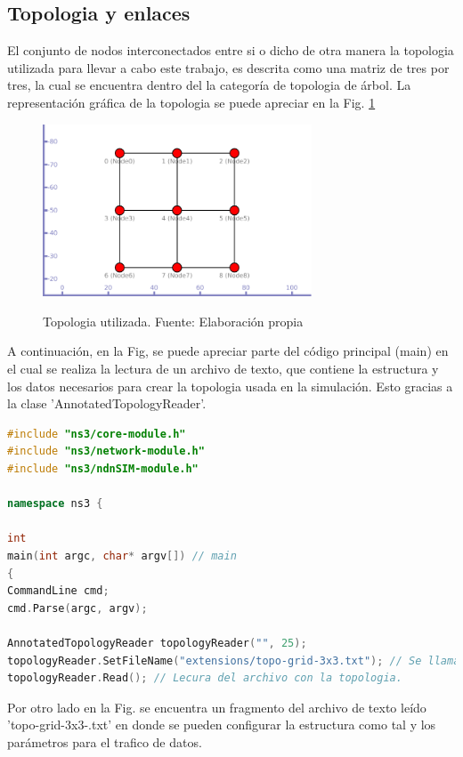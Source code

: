 \documentclass[12pt]{ociamthesis}  %
\begin{document}
\subsection{Topologia y enlaces}

El conjunto de nodos interconectados entre si o dicho de otra manera la topologia utilizada para llevar a cabo este trabajo, es descrita como una matriz de tres por tres, la cual se encuentra dentro del la categoría de topologia de árbol. La representación gráfica de la topologia se puede apreciar en la Fig. \ref{topologia_3x3_plugin}

\begin{figure}[!htb]
	\centering
	\includegraphics[width=8cm]{Imagenes/Matriz3x3.pdf}\\
	\caption{Topologia utilizada. Fuente: Elaboración propia}
	\label{topologia_3x3_plugin}
\end{figure}

A continuación, en la Fig, se puede apreciar parte del código principal (main) en el cual se realiza la lectura de un archivo de texto, que contiene la estructura y los datos necesarios para crear la topologia usada en la simulación. Esto gracias a la clase 'AnnotatedTopologyReader'.

\begin{lstlisting}[language=cpp,caption={Codigo fuente: main},label={codigo_topologia}]
#include "ns3/core-module.h"
#include "ns3/network-module.h"
#include "ns3/ndnSIM-module.h"

namespace ns3 {

int
main(int argc, char* argv[]) // main
{
CommandLine cmd;
cmd.Parse(argc, argv);

AnnotatedTopologyReader topologyReader("", 25); 
topologyReader.SetFileName("extensions/topo-grid-3x3.txt"); // Se llama al archivo 
topologyReader.Read(); // Lecura del archivo con la topologia.
\end{lstlisting}

\pagebreak
Por otro lado en la Fig. se encuentra un fragmento del archivo de texto leído 'topo-grid-3x3-.txt' en donde se pueden configurar la estructura como tal y los parámetros para el trafico de datos.
\end{document}
